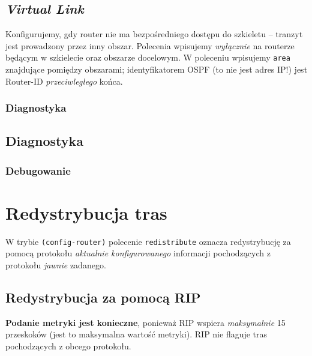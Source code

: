 \subsection{\textit{Virtual Link}}
Konfigurujemy, gdy router nie ma bezpośredniego dostępu do szkieletu -- tranzyt jest prowadzony przez inny obszar. Polecenia wpisujemy \textit{wyłącznie} na routerze będącym w szkielecie oraz obszarze docelowym. W poleceniu wpisujemy \texttt{area} znajdujące pomiędzy obszarami; identyfikatorem OSPF (to nie jest adres IP!) jest Router-ID \textit{przeciwległego} końca.

\subsubsection{Diagnostyka}

\subsection{Diagnostyka}

\subsubsection{Debugowanie}

\section{Redystrybucja tras}
W trybie \texttt{(config-router)} polecenie \texttt{redistribute} oznacza redystrybucję za pomocą protokołu \textit{aktualnie konfigurowanego} informacji pochodzących z protokołu \textit{jawnie} zadanego.

\subsection{Redystrybucja za pomocą RIP}
\textbf{Podanie metryki jest konieczne}, ponieważ RIP wspiera \textit{maksymalnie} 15 przeskoków (jest to maksymalna wartość metryki). RIP nie flaguje tras pochodzących z obcego protokołu.

